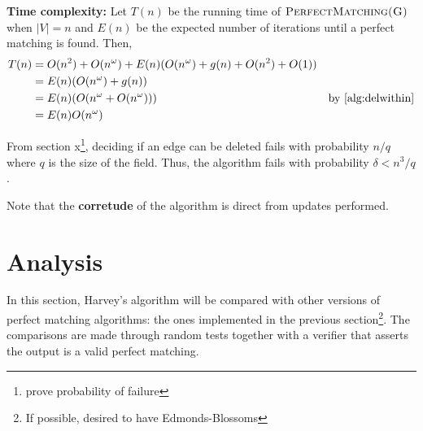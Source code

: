 \textbf{Time complexity: } Let \(T(n)\) be the running time of \(\textsc{PerfectMatching(G)}\) when \(|V| = n\) and \(E(n)\) be the expected number of iterations
until a perfect matching is found. Then,
\begin{align}
    T(n) &= O(n^2) + O(n^\omega) + E(n)(O(n^\omega) + g(n) + O(n^2) + O(1)) & \\
    &= E(n)(O(n^\omega) + g(n)) &  \\
    &= E(n)(O(n^\omega + O(n^\omega))) & \text{by \ref{alg:delwithin}} \\ 
    &= E(n)O(n^\omega) & 
\end{align}

From section x\footnote{prove probability of failure}, deciding if an edge can be deleted fails with probability \(n / q\) where \(q\) is the size of the field. 
Thus, the algorithm fails with probability \(\delta < n^3 / q\). 

Note that the \textbf{corretude} of the algorithm is direct from updates performed. 

\section{Analysis}

In this section, Harvey's algorithm will be compared with other versions of perfect matching algorithms: the ones implemented in the previous section\footnote{If possible, desired to have Edmonds-Blossoms}.
The comparisons are made through random tests together with a verifier that asserts the output is a valid perfect matching.
